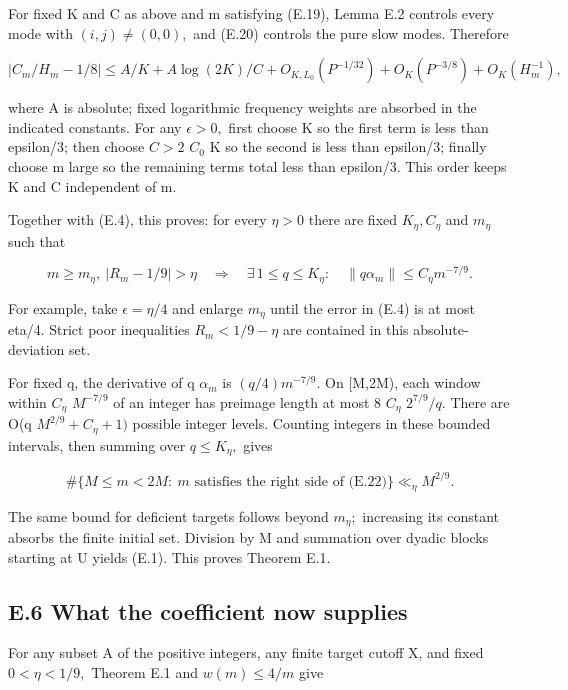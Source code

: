 \documentclass[11pt,a4paper]{article}
\begin{document}
For fixed K and C as above and m satisfying (E.19), Lemma E.2 controls
every mode with \((i,j)\ne (0,0),\) and (E.20) controls the pure slow
modes. Therefore

\[
 \left|C_m/H_m-1/8\right|
   \le A/K+A\log(2K)/C+O_{K,L_0}(P^{-1/32})
                         +O_K(P^{-3/8})+O_K(H_m^{-1}),
 \tag{E.21}
\]

where A is absolute; fixed logarithmic frequency weights are absorbed in
the indicated constants. For any \(\epsilon>0,\) first choose K so the
first term is less than epsilon/3; then choose \(C>2\) \(C_0\) K so the
second is less than epsilon/3; finally choose m large so the remaining
terms total less than epsilon/3. This order keeps K and C independent of
m.

Together with (E.4), this proves: for every \(\eta>0\) there are fixed
\(K_\eta,C_\eta\) and \(m_\eta\) such that

\[
 m\ge m_\eta,\ |R_m-1/9|>\eta
 \quad\Longrightarrow\quad
 \exists\,1\le q\le K_\eta:\quad
       \|q\alpha_m\|\le C_\eta m^{-7/9}.
 \tag{E.22}
\]

For example, take \(\epsilon=\eta/4\) and enlarge \(m_\eta\) until the
error in (E.4) is at most eta/4. Strict poor inequalities
\(R_m<1/9-\eta\) are contained in this absolute-deviation set.

For fixed q, the derivative of q \(\alpha_m\) is \((q/4)m^{-7/9}.\) On
{[}M,2M), each window within \(C_\eta\) \(M^{-7/9}\) of an integer has
preimage length at most 8 \(C_\eta\) \(2^{7/9}/q.\) There are O(q
\(M^{2/9}+C_\eta+1)\) possible integer levels. Counting integers in
these bounded intervals, then summing over \(q\le K_\eta,\) gives

\[
 \#\{M\le m<2M:\ m\text{ satisfies the right side of (E.22)}\}
                \ll_\eta M^{2/9}.
 \tag{E.23}
\]

The same bound for deficient targets follows beyond \(m_\eta;\)
increasing its constant absorbs the finite initial set. Division by M
and summation over dyadic blocks starting at U yields (E.1). This proves
Theorem E.1.

\subsection{E.6 What the coefficient now
supplies}\label{e.6-what-the-coefficient-now-supplies}

For any subset A of the positive integers, any finite target cutoff X,
and fixed \(0<\eta<1/9,\) Theorem E.1 and \(w(m)\le 4/m\) give
\end{document}
